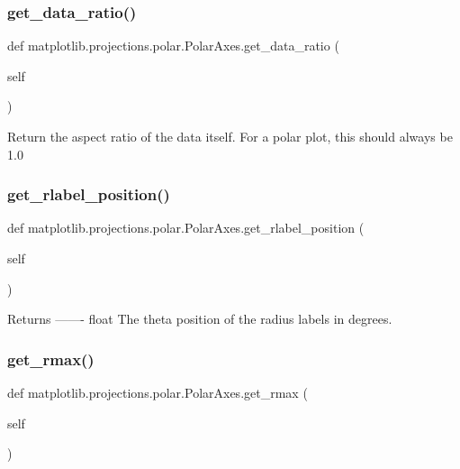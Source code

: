 \subsubsection{\texorpdfstring{get\+\_\+data\+\_\+ratio()}{get\_data\_ratio()}}
{\footnotesize\ttfamily def matplotlib.\+projections.\+polar.\+Polar\+Axes.\+get\+\_\+data\+\_\+ratio (\begin{DoxyParamCaption}\item[{}]{self }\end{DoxyParamCaption})}

\begin{DoxyVerb}Return the aspect ratio of the data itself.  For a polar plot,
this should always be 1.0
\end{DoxyVerb}
 \mbox{\label{classmatplotlib_1_1projections_1_1polar_1_1PolarAxes_a49cffc330d9684edd0f159571b5fb485}} 
\subsubsection{\texorpdfstring{get\+\_\+rlabel\+\_\+position()}{get\_rlabel\_position()}}
{\footnotesize\ttfamily def matplotlib.\+projections.\+polar.\+Polar\+Axes.\+get\+\_\+rlabel\+\_\+position (\begin{DoxyParamCaption}\item[{}]{self }\end{DoxyParamCaption})}

\begin{DoxyVerb}Returns
-------
float
    The theta position of the radius labels in degrees.
\end{DoxyVerb}
 \mbox{\label{classmatplotlib_1_1projections_1_1polar_1_1PolarAxes_ac6b4c9149ff20e0f8f28da8176f6ea72}} 
\subsubsection{\texorpdfstring{get\+\_\+rmax()}{get\_rmax()}}
{\footnotesize\ttfamily def matplotlib.\+projections.\+polar.\+Polar\+Axes.\+get\+\_\+rmax (\begin{DoxyParamCaption}\item[{}]{self }\end{DoxyParamCaption})}

